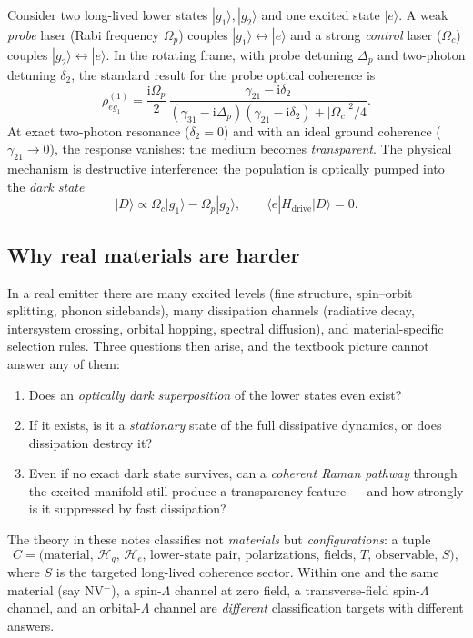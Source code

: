 \documentclass[11pt,a4paper]{article}
\theoremstyle{remark}
\newcommand{\Hg}{\mathcal{H}_g}
\newcommand{\He}{\mathcal{H}_e}
\newcommand{\im}{\mathrm{i}}
\newcommand{\ket}[1]{|#1\rangle}
\newcommand{\bra}[1]{\langle #1|}
\begin{document}
Consider two long-lived lower states $\ket{g_1},\ket{g_2}$ and one excited
state $\ket{e}$. A weak \emph{probe} laser (Rabi frequency $\Omega_p$) couples
$\ket{g_1}\leftrightarrow\ket{e}$ and a strong \emph{control} laser
($\Omega_c$) couples $\ket{g_2}\leftrightarrow\ket{e}$. In the rotating frame,
with probe detuning $\Delta_p$ and two-photon detuning $\delta_2$, the standard
result for the probe optical coherence is
\begin{equation}
\rho^{(1)}_{eg_1}
 = \frac{\im\Omega_p}{2}\,
   \frac{\gamma_{21}-\im\delta_2}
        {(\gamma_{31}-\im\Delta_p)(\gamma_{21}-\im\delta_2)+|\Omega_c|^2/4}.
\label{eq:textbook}
\end{equation}
At exact two-photon resonance ($\delta_2=0$) and with an ideal ground
coherence ($\gamma_{21}\to0$), the response vanishes: the medium becomes
\emph{transparent}. The physical mechanism is destructive interference: the
population is optically pumped into the \emph{dark state}
\begin{equation}
\ket{D}\propto \Omega_c\ket{g_1}-\Omega_p\ket{g_2},
\qquad
\bra{e}H_{\mathrm{drive}}\ket{D}=0 .
\end{equation}

\subsection{Why real materials are harder}

In a real emitter there are many excited levels (fine structure, spin--orbit
splitting, phonon sidebands), many dissipation channels (radiative decay,
intersystem crossing, orbital hopping, spectral diffusion), and material-specific
selection rules. Three questions then arise, and the textbook picture cannot
answer any of them:

\begin{enumerate}[label=(Q\arabic*)]
\item Does an \emph{optically dark superposition} of the lower states even exist?
\item If it exists, is it a \emph{stationary} state of the full dissipative
      dynamics, or does dissipation destroy it?
\item Even if no exact dark state survives, can a \emph{coherent Raman pathway}
      through the excited manifold still produce a transparency feature ---
      and how strongly is it suppressed by fast dissipation?
\end{enumerate}

\begin{keyidea}
The theory in these notes classifies not \emph{materials} but
\emph{configurations}: a tuple
\[
C=\bigl(\text{material},\,\Hg,\,\He,\,
\text{lower-state pair},\,\text{polarizations},\,
\text{fields},\,T,\,\text{observable},\,S\bigr),
\]
where $S$ is the targeted long-lived coherence sector. Within one and the same
material (say NV$^-$), a spin-$\Lambda$ channel at zero field, a
transverse-field spin-$\Lambda$ channel, and an orbital-$\Lambda$ channel are
\emph{different} classification targets with different answers.
\end{keyidea}
\end{document}
